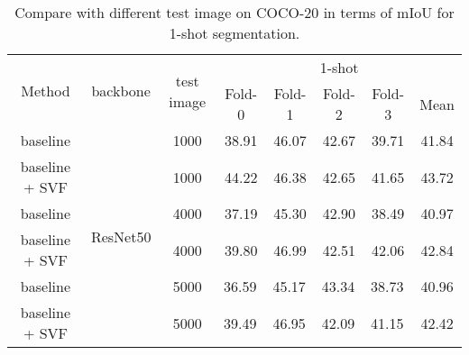 \documentclass{article}
\begin{document}
\begin{table}[]\small
\vspace{-0.7em}
\centering
\setlength\tabcolsep{4pt}
\renewcommand\arraystretch{1.3}
\caption{Compare with different test image on COCO-20 in terms of mIoU for 1-shot segmentation.}
\label{tab:coconum}
\begin{tabular}{c|c|c|ccccc}
\hline
\multirow{2}{*}{Method} & \multirow{2}{*}{backbone} & \multirow{2}{*}{test image} & \multicolumn{5}{c}{1-shot}                                                                                              \\ \cline{4-8} 
                        &                           &                             & Fold-0                    & Fold-1                    & Fold-2                    & \multicolumn{1}{c|}{Fold-3} & Mean  \\ \hline
baseline                & \multirow{6}{*}{ResNet50} & 1000                        & 38.91                     & 46.07                     & 42.67                     & \multicolumn{1}{c|}{39.71}  & 41.84 \\
baseline + SVF          &                           & 1000                        & 44.22                     & 46.38                     & 42.65                     & \multicolumn{1}{c|}{41.65}  & 43.72 \\ \cline{1-1} \cline{3-8} 
baseline                &                           & 4000                        & 37.19                     & 45.30                     & 42.90                     & \multicolumn{1}{c|}{38.49}  & 40.97 \\
baseline + SVF          &                           & 4000                        & 39.80                     & 46.99                     & 42.51                     & \multicolumn{1}{c|}{42.06}  & 42.84 \\ \cline{1-1} \cline{3-8} 
baseline                &                           & 5000                        & \multicolumn{1}{l}{36.59} & \multicolumn{1}{l}{45.17} & \multicolumn{1}{l}{43.34} & \multicolumn{1}{l|}{38.73}  & 40.96 \\
baseline + SVF          &                           & 5000                        & \multicolumn{1}{l}{39.49} & \multicolumn{1}{l}{46.95} & \multicolumn{1}{l}{42.09} & \multicolumn{1}{l|}{41.15}  & 42.42 \\ \hline
\end{tabular}
\end{table}
\end{document}
